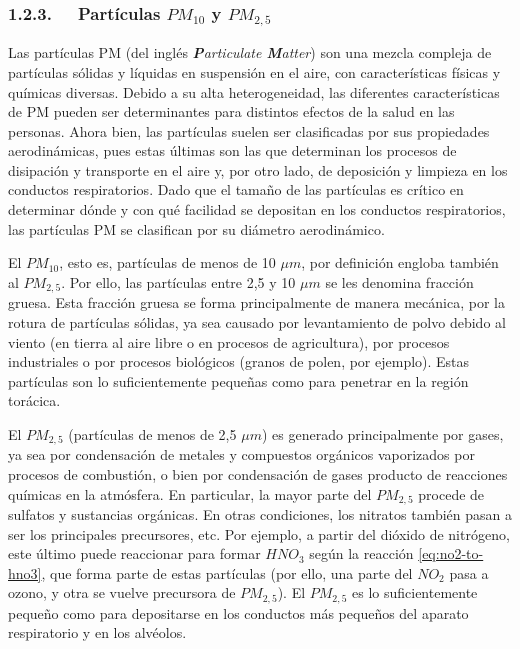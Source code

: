 \documentclass[12pt]{article}
\begin{document}
\subsubsection*{1.2.3. $\>$ $\>$ Partículas \textbf{\texorpdfstring{$PM_{10}$}{PM10}} y \textbf{\texorpdfstring{$PM_{2,5}$}{PM2,5}}}
%

Las partículas PM (del inglés \textit{\textbf{P}articulate \textbf{M}atter}) son una mezcla compleja de partículas sólidas y líquidas en suspensión en el aire, con características físicas y químicas diversas. Debido a su alta heterogeneidad, las diferentes características de PM pueden ser determinantes para distintos efectos de la salud en las personas. Ahora bien, las partículas suelen ser clasificadas por sus propiedades aerodinámicas, pues estas últimas son las que determinan los procesos de disipación y transporte en el aire y, por otro lado, de deposición y limpieza en los conductos respiratorios. Dado que el tamaño de las partículas es crítico en determinar dónde y con qué facilidad se depositan en los conductos respiratorios, las partículas PM se clasifican por su diámetro aerodinámico.

El $PM_{10}$, esto es, partículas de menos de 10 $\mu m$, por definición engloba también al $PM_{2,5}$. Por ello, las partículas entre 2,5 y 10 $\mu m$ se les denomina fracción gruesa. Esta fracción gruesa se forma principalmente de manera mecánica, por la rotura de partículas sólidas, ya sea causado por levantamiento de polvo debido al viento (en tierra al aire libre o en procesos de agricultura), por procesos industriales o por procesos biológicos (granos de polen, por ejemplo). Estas partículas son lo suficientemente pequeñas como para penetrar en la región torácica.

El $PM_{2,5}$ (partículas de menos de 2,5 $\mu m$) es generado principalmente por gases, ya sea por condensación de metales y compuestos orgánicos vaporizados por procesos de combustión, o bien por condensación de gases producto de reacciones químicas en la atmósfera. En particular, la mayor parte del $PM_{2,5}$ procede de sulfatos y sustancias orgánicas. En otras condiciones, los nitratos también pasan a ser los principales precursores, etc. Por ejemplo, a partir del dióxido de nitrógeno, este último puede reaccionar para formar $HNO_{3}$ según la reacción \ref{eq:no2-to-hno3}, que forma parte de estas partículas (por ello, una parte del $NO_{2}$ pasa a ozono, y otra se vuelve precursora de $PM_{2,5}$). El $PM_{2,5}$ es lo suficientemente pequeño como para depositarse en los conductos más pequeños del aparato respiratorio y en los alvéolos.
\end{document}
